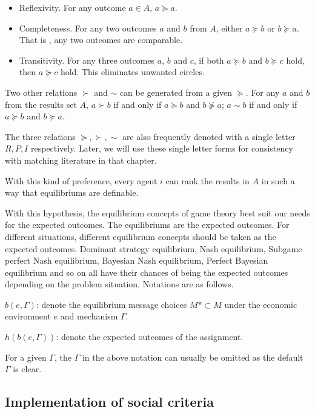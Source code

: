 \begin{itemize}
\item Reflexivity. For any outcome $a \in A$, $a\succeq a$.
\item Completeness. For any two outcomes $a$ and $b$ from $A$, either $a\succeq
  b$ or $b\succeq a$. That is , any two outcomes are comparable.
\item Transitivity. For any three outcomes $a$, $b$ and $c$, if both
  $a \succeq b$ and $b \succeq c$ hold, then $a \succeq c$ hold. This
  eliminates unwanted circles.
\end{itemize}

Two other relations $\succ$ and $\sim$ can be generated from a given
$\succeq$.
For any $a$ and $b$ from the results set $A$, $a \succ b$ if and only
if $a \succeq b$ and $b \not \succeq a$; $a \sim b$ if and only if  $a
\succeq b$ and $b \succeq a$. 

The three relations $\succeq, \succ,\sim$ are also frequently denoted
with a single letter $R, P, I$ respectively. Later, we will use these
single letter forms for consistency with matching literature in that
chapter.


With this kind of preference, every agent $i$ can rank the results in
$A$ in such a way that equilibriums are definable.

With this hypothesis, the equilibrium concepts of game theory best suit our needs for the expected outcomes. The equilibriums are the expected outcomes. For different situations, different equilibrium concepts should be taken as the expected outcomes. Dominant strategy equilibrium, Nash equilibrium, Subgame perfect Nash equilibrium, Bayesian Nash equilibrium, Perfect Bayesian equilibrium and so on all have their chances of being the expected outcomes depending on the problem situation. Notations are as follows.

$b(e,\Gamma)$: denote the equilibrium message choices $M* \subset M$ under the economic environment $e$ and mechanism $\Gamma$.

$h(b(e,\Gamma))$: denote the expected outcomes of the assignment.

For a given $\Gamma$, the $\Gamma$ in the above notation can usually
be omitted as the default $\Gamma$ is clear.






  

\subsection{Implementation of social criteria}

